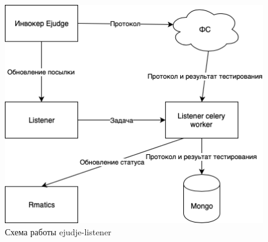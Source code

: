 \begin{figure}
  \centering
  \includegraphics[width=\textwidth]{figures/listener.png}
  \caption{Схема работы ejudje-listener}
  \label{fig:ejudge_listener}
\end{figure}

